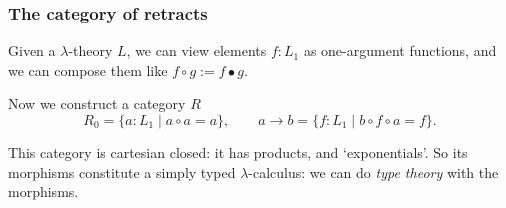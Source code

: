 \documentclass[aspectratio=169]{fancyslides} %
\begin{document}
  \begin{frame}[fragile]
    \begin{columns}
      \begin{column}{.5\textwidth}
        \tableofcontents[currentsubsection]
      \end{column}
      \begin{column}{.5\textwidth}
      \end{column}
    \end{columns}
  \end{frame}
  \begin{frame}
    \frametitle{The category of retracts}

    Given a $ \lambda $-theory $ L $, we can view elements $ f: L_1 $ as one-argument functions, and we can compose them like $ f \circ g := f \bullet g $.

    Now we construct a category $ R $
    \[ R_0 = \{ a : L_1 \mid a \circ a = a \}, \qquad a \to b = \{ f: L_1 \mid b \circ f \circ a = f \}. \]

    \pause

    This category is cartesian closed: it has products, and `exponentials'. So its morphisms constitute a simply typed $ \lambda $-calculus: we can do \textit{type theory} with the morphisms.
  \end{frame}
\end{document}
